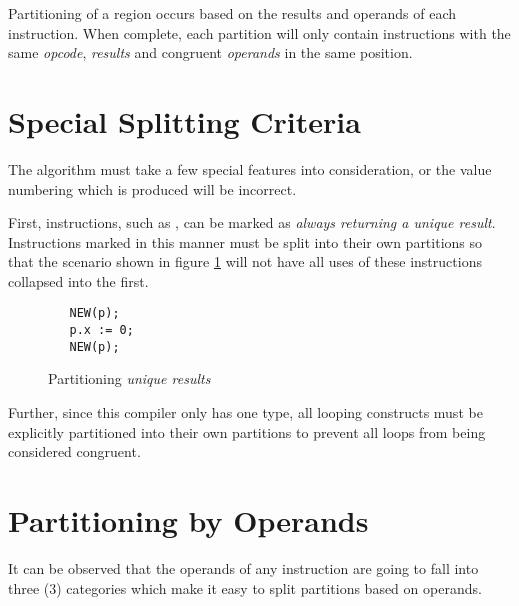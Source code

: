 Partitioning of a region occurs based on the results and operands of
each instruction.  When complete, each partition will only contain
instructions with the same \emph{opcode}, \emph{results} and congruent
\emph{operands} in the same position.

\section{Special Splitting Criteria}

The algorithm must take a few special features into consideration, or
the value numbering which is produced will be incorrect.

First, instructions, such as , can be marked as
\emph{always returning a unique result}.  Instructions marked in this
manner must be split into their own partitions so that the scenario
shown in figure \ref{fig:unique-results} will not have all uses of
these instructions collapsed into the first.

\begin{figure}[h!]
\begin{verbatim}
   NEW(p);
   p.x := 0;
   NEW(p);
\end{verbatim}
  \caption{Partitioning \emph{unique results}}\label{fig:unique-results}
\end{figure}

Further, since this compiler only has one  type,
all looping constructs must be explicitly partitioned into their own
partitions to prevent all loops from being considered congruent.

\section{Partitioning by Operands}
It can be observed that the operands of any instruction are going to
fall into three (3) categories which make it easy to split partitions
based on operands.

